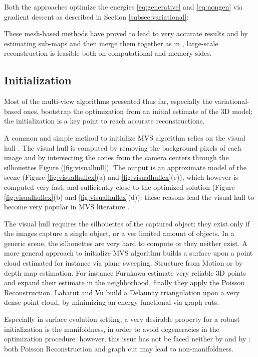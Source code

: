Both the approaches optimize the energies \eqref{eq:generative} and \eqref{eq:nongen} via gradient descent as described in Section \ref{subsec:variational}:

These mesh-based methods have proved to lead to very accurate results and  by estimating  sub-maps and then merge them together as in \cite{vu2011large},  large-scale reconstruction is feasible both on computational and memory sides.


\subsection{Initialization}
Most of the  multi-view algorithms presented thus far, especially the variational-based ones, bootstrap the optimization from an initial estimate of the 3D model; the initialization is a key point to reach accurate reconstructions.

A common and simple method to initialize MVS algorithm relies on the visual hull \cite{laurentini1994visual}. 
The visual hull is computed by removing the background pixels of each image and by intersecting the cones from the camera centers through the silhouettes Figure (\ref{fig:visualhull}). 
The output is an approximate model of the scene (Figure \ref{fig:visualhullex}(a) and \ref{fig:visualhullex}(c)), which however is computed very fast, and sufficiently close to the optimized solution (Figure \ref{fig:visualhullex}(b) and \ref{fig:visualhullex}(d)): these reasons lead the visual hull to become very popular in MVS literature \cite{jin2002variational,soatto2003tales,zaharescu2007transformesh,yoon2010joint}.

The visual hull requires the silhouettes of the captured object: they exist only if the images capture a single object, or a ver limited amount of objects.
In a generic scene, the silhouettes are very hard to compute or they neither exist.
A more general approach to initialize MVS algorithm builds a surface upon a point cloud estimated for instance via plane sweeping, Structure from Motion or by depth map estimation.
For instance Furukawa \etal \cite{fu10} estimate very reliable 3D points and expand their estimate in the neighborhood, finally they apply the Poisson Reconstruction. 
Labatut \etal \cite{labatut2007efficient} and Vu \etal \cite{vu_et_al_2012} build a Delaunay triangulation upon a very dense point cloud, by minimizing an energy functional via graph cuts.

Especially in surface evolution setting, a very desirable property for a robust initialization is the manifoldness, in order to avoid degeneracies in the optimization procedure. 
however, this issue has not be faced neither by \cite{fu10} and by \cite{labatut2007efficient,vu_et_al_2012}: both Poisson Reconstruction and graph cut may lead to non-manifoldness.

